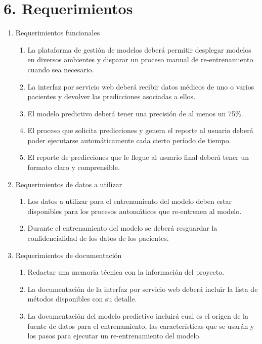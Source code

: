 \documentclass[
11pt, %
]{charter}
\begin{document}
\section{6. Requerimientos}
\label{sec:requerimientos}

\begin{enumerate}
	\item Requerimientos funcionales
		\begin{enumerate}
			\item La plataforma de gestión de modelos deberá permitir desplegar modelos en diversos ambientes y disparar un proceso manual de re-entrenamiento cuando sea necesario.
			\item La interfaz por servicio web deberá recibir datos médicos de uno o varios pacientes y devolver las predicciones asociadas a ellos.			
			\item El modelo predictivo deberá tener una precisión de al menos un 75\%.
			\item El proceso que solicita predicciones y genera el reporte al usuario deberá poder ejecutarse automáticamente cada cierto período de tiempo.		
			\item El reporte de predicciones que le llegue al usuario final deberá tener un formato claro y comprensible.
		\end{enumerate}
	\item Requerimientos de datos a utilizar
		\begin{enumerate}		
		\item Los datos a utilizar para el entrenamiento del modelo deben estar disponibles para los procesos automáticos que re-entrenen al modelo.
		\item Durante el entrenamiento del modelo se deberá resguardar la confidencialidad de los datos de los pacientes.		
		\end{enumerate}
	\item Requerimientos de documentación
		\begin{enumerate}
			\item Redactar una memoria técnica con la información del proyecto.
			\item La documentación de la interfaz por servicio web deberá incluir la lista de métodos disponibles con su detalle.
			\item La documentación del modelo predictivo incluirá cual es el origen de la fuente de datos para el entrenamiento,  las características que se usarán y los pasos para ejecutar un re-entrenamiento del modelo.
		\end{enumerate}		
\end{enumerate}
\end{document}
